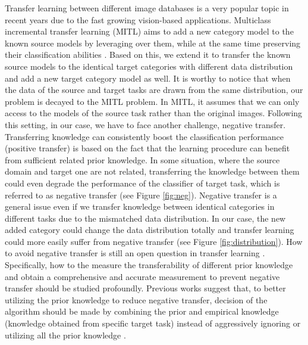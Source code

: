Transfer learning between different image databases is a very popular topic in recent years due to the fast growing vision-based applications. Multiclass incremental transfer learning (MITL) aims to add a new category model to the known source models by leveraging over them, while at the same time preserving their classification abilities \cite{kuzborskij2013n}. Based on this, we extend it to transfer the known source models to the identical target categories with different data distribution and add a new target category model as well. It is worthy to notice that when the data of the source and target tasks are drawn from the same distribution, our problem is decayed to the MITL problem. In MITL, it assumes that we can only access to the models of the source task rather than the original images. Following this setting, in our case, we have to face another challenge, negative transfer. Transferring knowledge can consistently boost the classification performance (positive transfer) is based on the fact that the learning procedure can benefit from sufficient related prior knowledge. In some situation, where the source domain and target one are not related, transferring the knowledge between them could even degrade the performance of the classifier of target task, which is referred to as negative transfer (see Figure \ref{fig:neg}). 
Negative transfer is a general issue even if we transfer knowledge between identical categories in different tasks due to the mismatched data distribution. In our case, the new added category could change the data distribution totally and transfer learning could more easily suffer from negative transfer (see Figure \ref{fig:distribution}). 
How to avoid negative transfer is still an open question in transfer learning \cite{Lu201514}. Specifically, how to the measure the transferability of different prior knowledge and obtain a comprehensive and accurate measurement to prevent negative transfer should be studied profoundly. Previous works suggest that, to better utilizing the prior knowledge to reduce negative transfer, decision of the algorithm should be made by combining the prior and empirical knowledge (knowledge obtained from specific target task) instead of aggressively ignoring or utilizing all the prior knowledge \cite{tommasi2014learning} \cite{kuzborskij2013n} \cite{yang2007cross} \cite{aytar2011tabula}.
